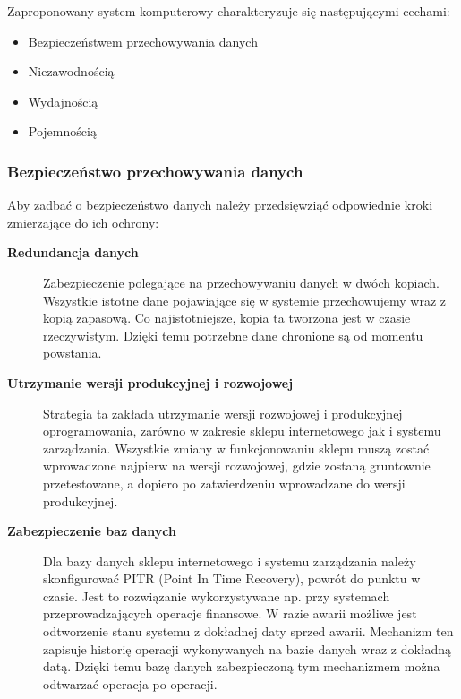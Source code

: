 \par Zaproponowany system komputerowy charakteryzuje się następującymi cechami:
				
				\begin{itemize}
					\item Bezpieczeństwem przechowywania danych
					\item Niezawodnością
					\item Wydajnością
					\item Pojemnością
				\end{itemize}
		
				\subsubsection{Bezpieczeństwo przechowywania danych}
					Aby zadbać o bezpieczeństwo danych należy przedsięwziąć odpowiednie kroki zmierzające do ich ochrony:
				
					\begin{description}
					
						\item[\textbf{Redundancja danych}] Zabezpieczenie polegające na przechowywaniu danych w dwóch kopiach. Wszystkie istotne dane pojawiające się w systemie przechowujemy wraz z kopią zapasową. Co najistotniejsze, kopia ta tworzona jest w czasie rzeczywistym. Dzięki temu potrzebne dane chronione są od momentu powstania.
				
						\item[\textbf{Utrzymanie wersji produkcyjnej i rozwojowej}] Strategia ta zakłada utrzymanie wersji rozwojowej i produkcyjnej oprogramowania, zarówno w zakresie sklepu internetowego jak i systemu zarządzania. Wszystkie zmiany w funkcjonowaniu sklepu muszą zostać wprowadzone najpierw na wersji rozwojowej, gdzie zostaną gruntownie przetestowane, a dopiero po zatwierdzeniu wprowadzane do wersji produkcyjnej. 
						
						\item[\textbf{Zabezpieczenie baz danych}] Dla bazy danych sklepu internetowego i systemu zarządzania należy skonfigurować PITR (Point In Time Recovery), powrót do punktu w czasie. Jest to rozwiązanie wykorzystywane np. przy systemach przeprowadzających operacje finansowe. W razie awarii możliwe jest odtworzenie stanu systemu z dokładnej daty sprzed awarii. Mechanizm ten zapisuje historię operacji wykonywanych na bazie danych wraz z dokładną datą. Dzięki temu bazę danych zabezpieczoną tym mechanizmem można odtwarzać operacja po operacji.

					\end{description}
					
